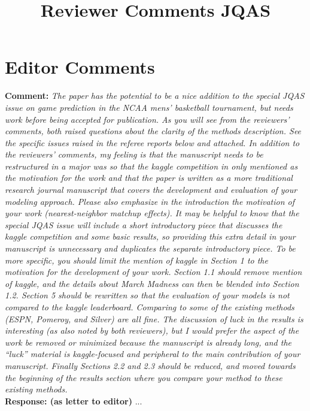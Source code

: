 \documentclass[11pt]{article} %
\title{Reviewer Comments JQAS}
\begin{document}
\maketitle


\section*{Editor Comments}
{\bf Comment: } \emph{The paper has the potential to be a nice addition to the special JQAS issue on game prediction in the NCAA mens' basketball tournament, but needs work before being accepted for publication. As you will see from the reviewers' comments, both raised questions about the clarity of the methods description. See the specific issues raised in the referee reports below and attached. In addition to the reviewers' comments, my feeling is that the manuscript needs to be restructured in a major was so that the kaggle competition in only mentioned as the motivation for the work and that the paper is written as a more traditional research journal manuscript that covers the development and evaluation of your modeling approach. Please also emphasize in the introduction the motivation of your work (nearest-neighbor matchup effects). It may be helpful to know that the special JQAS issue will include a short introductory piece that discusses the kaggle competition and some basic results, so providing this extra detail in your manuscript is unnecessary and duplicates the separate introductory piece. To be more specific, you should limit the mention of kaggle in Section 1 to the motivation for the development of your work. Section 1.1 should remove mention of kaggle, and the details about March Madness can then be blended into Section 1.2. Section 5 should be rewritten so that the evaluation of your models is not compared to the kaggle leaderboard. Comparing to some of the existing methods (ESPN, Pomeroy, and Silver) are all fine. The discussion of luck in the results is interesting (as also noted by both reviewers), but I would prefer the aspect of the work be removed or minimized because the manuscript is already long, and the ``luck'' material is kaggle-focused and peripheral to the main contribution of your manuscript. Finally Sections 2.2 and 2.3 should be reduced, and moved towards the beginning of the results section where you compare your method to these existing methods.}\\
{\bf Response: (as letter to editor)} ...
\end{document}
